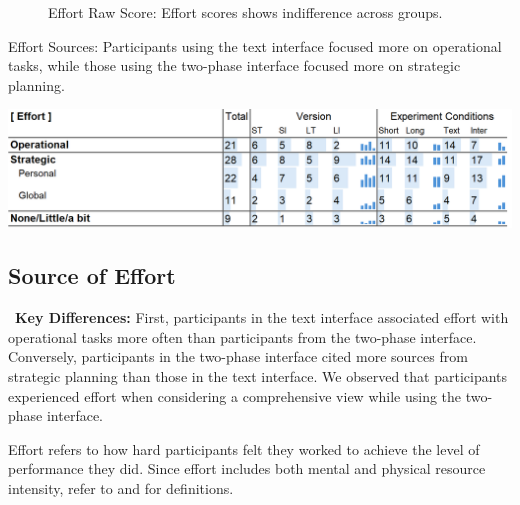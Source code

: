 \begin{figure}[h]
\begin{minipage}[t]{0.45\textwidth}
        \captionsetup{width=0.9\textwidth, justification=justified} %
        \caption{Effort Raw Score: Effort scores shows indifference across groups.}
        \label{fig:effort_cog_score}
    \end{minipage}
\end{figure}

\begin{table}[h]
    \caption{Effort Sources: Participants using the text interface focused more on operational tasks, while those using the two-phase interface focused more on strategic planning.}
    \label{tbl:physical}
    \includegraphics[width=\linewidth]{content/image/cog/effort_table.png}
\end{table}

\subsection{Source of Effort}
\label{sec:effort}

\begin{tldrbox}
   \faKey~\textbf{Key Differences:} First, participants in the text interface associated effort with operational tasks more often than participants from the two-phase interface. Conversely, participants in the two-phase interface cited more sources from strategic planning than those in the text interface. We observed that participants experienced effort when considering a comprehensive view while using the two-phase interface.
   
\end{tldrbox}
Effort refers to how hard participants felt they worked to achieve the level of performance they did. Since effort includes both mental and physical resource intensity, refer to  and  for definitions.

